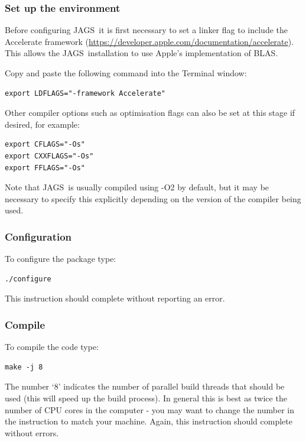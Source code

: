 \documentclass[11pt, a4paper, titlepage]{article}
\newcommand{\JAGS}{\textsf{JAGS}}
\newcommand{\code}[1]{{\bgroup{\normalfont\ttfamily #1}\egroup}}
\begin{document}
\subsubsection{Set up the environment}
\label{section:osxenvironment}

Before configuring \JAGS\ it is first necessary to set a linker flag to
include the Accelerate framework (\url{https://developer.apple.com/documentation/accelerate}).  
This allows the \JAGS\ installation to use Apple's implementation of BLAS.

Copy and paste the following command into the Terminal window:

\begin{verbatim}
export LDFLAGS="-framework Accelerate"
\end{verbatim}

Other compiler options such as optimisation flags can also be set at 
this stage if desired, for example:

\begin{verbatim}
export CFLAGS="-Os"
export CXXFLAGS="-Os"
export FFLAGS="-Os"
\end{verbatim}

Note that \JAGS\ is usually compiled using \code{-O2} by default, but 
it may be necessary to specify this explicitly depending on the version
of the compiler being used.

\subsubsection{Configuration}

To configure the package type:

\begin{verbatim}
./configure
\end{verbatim}

This instruction should complete without reporting an error.

\subsubsection{Compile}
\label{section:osxcompile}

To compile the code type: 

\begin{verbatim} 
make -j 8 
\end{verbatim} 

The number `8' indicates the number of parallel build threads that
should be used (this will speed up the build process).  In general this
is best as twice the number of CPU cores in the computer - you may want
to change the number in the instruction to match your machine. Again,
this instruction should complete without errors.
\end{document}
